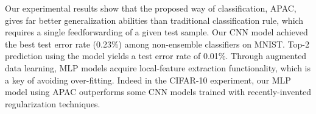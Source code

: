\documentclass[10pt,twocolumn,letterpaper]{article}
\begin{document}
Our experimental results show that the proposed way of classification, APAC, gives far better
generalization abilities than traditional classification rule, which requires a single feedforwarding of 
a given test sample.
Our CNN model achieved the best test error rate (0.23\%) among non-ensemble classifiers on MNIST.
Top-2 prediction using the model yields a test error rate of 0.01\%.
Through augmented data learning, MLP models acquire local-feature extraction functionality,
which is a key of avoiding over-fitting.
Indeed in the CIFAR-10 experiment, our MLP model using APAC outperforms some CNN models trained with
recently-invented regularization techniques.

{\small


}
\end{document}
